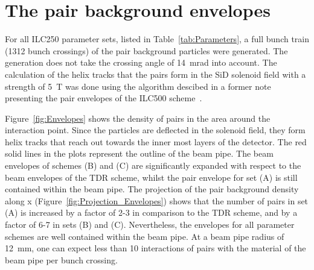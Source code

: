 \section{The pair background envelopes}
\label{sec:Envelopes}
For all ILC250 parameter sets, listed in Table~\ref{tab:Parameters}, a full bunch train (1312 bunch crossings) of the pair background particles were generated.
The \guineapig generation does not take the crossing angle of \SI{14}{\milli\radian} into account.
The calculation of the helix tracks that the pairs form in the SiD solenoid field with a strength of \SI{5}{\tesla} was done using the algorithm descibed in a former note presenting the pair envelopes of the ILC500 scheme~\cite{HelixProceeding}.

Figure~\ref{fig:Envelopes} shows the density of pairs in the area around the interaction point.
Since the particles are deflected in the solenoid field, they form helix tracks that reach out towards the inner most layers of the detector.
The red solid lines in the plots represent the outline of the beam pipe.
The beam envelopes of schemes (B) and (C) are significantly expanded with respect to the beam envelopes of the TDR scheme, whilst the pair envelope for set (A) is still contained within the beam pipe.
The projection of the pair background density along x (Figure~\ref{fig:Projection_Envelopes}) shows that the number of pairs in set (A) is increased by a factor of 2-3 in comparison to the TDR scheme, and by a factor of 6-7 in sets (B) and (C).
Nevertheless, the envelopes for all parameter schemes are well contained within the beam pipe.
At a beam pipe radius of \SI{12}{\milli\meter}, one can expect less than 10 interactions of pairs with the material of the beam pipe per bunch crossing.

